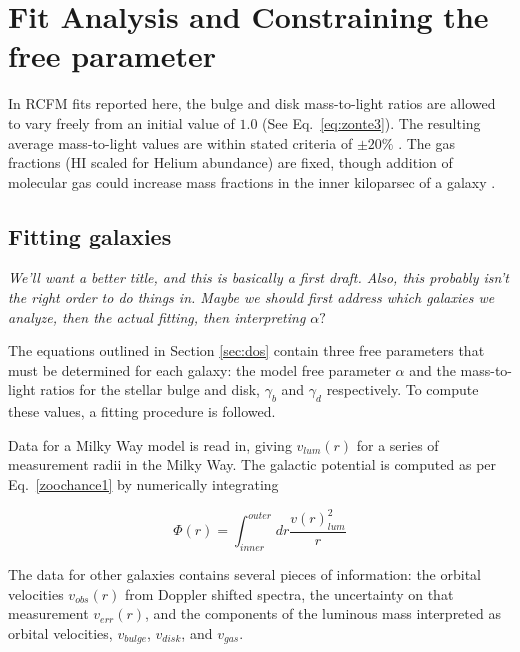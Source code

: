 \documentclass[reprint,%
 amsmath,amssymb,
 aps,
]{revtex4-1}
\begin{document}
 

 


 








\section{Fit Analysis and Constraining the free parameter \label{sec:analysis}}
 
 
In RCFM fits reported here, the    bulge and disk mass-to-light ratios are allowed to vary freely from an initial value of $1.0$ (See Eq.~\ref{eq:zonte3}). The resulting average mass-to-light    values are within stated criteria    of $\pm 20\%$ \cite{2016Lelli}. The gas fractions (HI scaled for Helium abundance) are fixed,  though addition of molecular gas could increase mass fractions in the inner kiloparsec of a galaxy   \cite{2004ApJ...609..652M}.

\subsection{Fitting galaxies}
\emph{We'll want a better title, and this is basically a first draft.  Also, this probably isn't the right order to do things in. Maybe we should first address which galaxies we analyze, then the actual fitting, then interpreting $\alpha?$}

The equations outlined in Section \ref{sec:dos} contain three free parameters that must be determined for each galaxy: the model free parameter $\alpha$ and the mass-to-light ratios for the stellar bulge and disk, $\gamma_b$ and $\gamma_d$ respectively. To compute these values, a fitting procedure is followed.

Data for a Milky Way model is read in, giving $v_{lum}(r)$ for a series of measurement radii in the Milky Way. The galactic potential is computed as per Eq.~\ref{zoochance1} by numerically integrating

\begin{equation}
\Phi(r) = \int_{inner}^{outer} dr \frac{ 
v(r)^2_{lum} 
}{r}
\end{equation}

The data for other galaxies contains several pieces of information: the orbital velocities $v_{obs}(r)$ from Doppler shifted spectra, the uncertainty on that measurement $v_{err}(r)$, and the components of the luminous mass interpreted as orbital velocities,  $v_{bulge}$, $v_{disk}$, and $v_{gas}$. 
\end{document}
